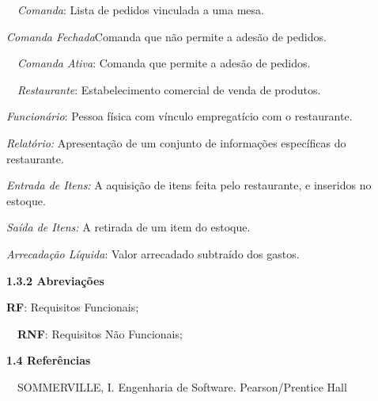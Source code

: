 {
\textcolor[rgb]{0.078431375,0.09411765,0.13725491}{\ \ }\textit{Comanda}: Lista de pedidos vinculada a uma mesa. }

{
\textit{\textcolor[rgb]{0.078431375,0.09411765,0.13725491}{Comanda
Fechada}}\textcolor[rgb]{0.078431375,0.09411765,0.13725491}{Comanda que não permite a adesão de pedidos.}}

{
\ \ \textit{Comanda Ativa}: Comanda que permite a adesão de pedidos.}

{
\textcolor[rgb]{0.078431375,0.09411765,0.13725491}{\ \ }\textit{\textcolor[rgb]{0.078431375,0.09411765,0.13725491}{Restaurante}}\textcolor[rgb]{0.078431375,0.09411765,0.13725491}{:
Estabelecimento comercial de venda de produtos.}}

{
\textit{Funcionário}: Pessoa física com vínculo empregatício com o restaurante. }

{
\textit{Relatório:} Apresentação de um conjunto de informações específicas do restaurante.}

{
\textit{Entrada de Itens:} A aquisição de itens feita pelo restaurante, e inseridos no estoque.}

{
\textit{Saída de Itens:} A retirada de um item do estoque.}

{
\textit{Arrecadação Líquida}: Valor arrecadado subtraído dos gastos.}


\bigskip

{
\textbf{\textcolor[rgb]{0.078431375,0.09411765,0.13725491}{1.3.2 Abreviações}}}

{
\textbf{\textcolor[rgb]{0.078431375,0.09411765,0.13725491}{RF}}\textcolor[rgb]{0.078431375,0.09411765,0.13725491}{:
Requisitos Funcionais;}}

{
\textcolor[rgb]{0.078431375,0.09411765,0.13725491}{\ \ }\textbf{\textcolor[rgb]{0.078431375,0.09411765,0.13725491}{RNF}}\textcolor[rgb]{0.078431375,0.09411765,0.13725491}{:
Requisitos Não Funcionais;}}


\bigskip

{
\textbf{\textcolor[rgb]{0.078431375,0.09411765,0.13725491}{1.4 Referências}}}

{
\textcolor[rgb]{0.078431375,0.09411765,0.13725491}{\ \ SOMMERVILLE, I. Engenharia de Software.
}\foreignlanguage{english}{\textcolor[rgb]{0.078431375,0.09411765,0.13725491}{Pearson/Prentice Hall}}}

